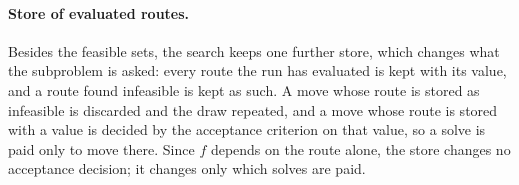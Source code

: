 \documentclass[11pt]{article}
\begin{document}
\paragraph{Store of evaluated routes.}\label{app:store}
Besides the feasible sets, the search keeps one further store, which changes what the subproblem is asked: every route the run has evaluated is kept with its value, and a route found infeasible is kept as such. A move whose route is stored as infeasible is discarded and the draw repeated, and a move whose route is stored with a value is decided by the acceptance criterion on that value, so a solve is paid only to move there. Since $f$ depends on the route alone, the store changes no acceptance decision; it changes only which solves are paid.



\end{document}
